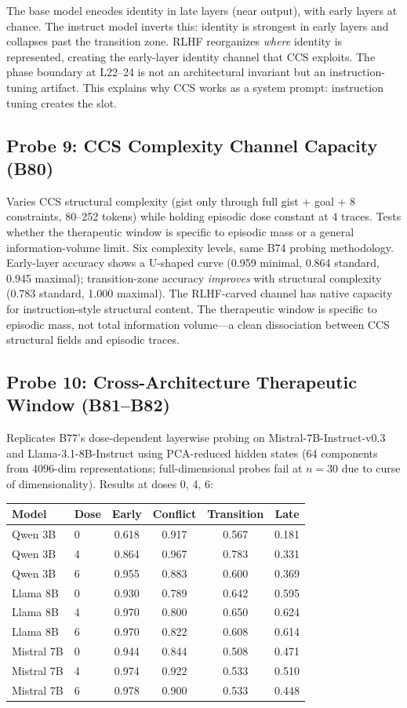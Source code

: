 \documentclass[11pt,a4paper]{article}
\begin{document}
The base model encodes identity in late layers (near output), with early
layers at chance. The instruct model inverts this: identity is strongest
in early layers and collapses past the transition zone. RLHF reorganizes
\emph{where} identity is represented, creating the early-layer identity
channel that CCS exploits. The phase boundary at L22--24 is not an
architectural invariant but an instruction-tuning artifact. This explains
why CCS works as a system prompt: instruction tuning creates the slot.

\subsection{Probe 9: CCS Complexity Channel Capacity (B80)}

Varies CCS structural complexity (gist only through full gist + goal + 8 constraints,
80--252 tokens) while holding episodic dose constant at 4 traces. Tests whether the
therapeutic window is specific to episodic mass or a general information-volume limit.
Six complexity levels, same B74 probing methodology. Early-layer accuracy shows a
U-shaped curve (0.959 minimal, 0.864 standard, 0.945 maximal); transition-zone
accuracy \emph{improves} with structural complexity (0.783 standard, 1.000 maximal).
The RLHF-carved channel has native capacity for instruction-style structural content.
The therapeutic window is specific to episodic mass, not total information volume---a
clean dissociation between CCS structural fields and episodic traces.

\subsection{Probe 10: Cross-Architecture Therapeutic Window (B81--B82)}

Replicates B77's dose-dependent layerwise probing on Mistral-7B-Instruct-v0.3
and Llama-3.1-8B-Instruct using PCA-reduced hidden states (64 components from
4096-dim representations; full-dimensional probes fail at $n=30$ due to
curse of dimensionality). Results at doses 0, 4, 6:

\begin{center}
\begin{tabular}{llcccc}
\toprule
Model & Dose & Early & Conflict & Transition & Late \\
\midrule
Qwen 3B  & 0 & 0.618 & 0.917 & 0.567 & 0.181 \\
Qwen 3B  & 4 & 0.864 & 0.967 & 0.783 & 0.331 \\
Qwen 3B  & 6 & 0.955 & 0.883 & 0.600 & 0.369 \\
\midrule
Llama 8B & 0 & 0.930 & 0.789 & 0.642 & 0.595 \\
Llama 8B & 4 & 0.970 & 0.800 & 0.650 & 0.624 \\
Llama 8B & 6 & 0.970 & 0.822 & 0.608 & 0.614 \\
\midrule
Mistral 7B & 0 & 0.944 & 0.844 & 0.508 & 0.471 \\
Mistral 7B & 4 & 0.974 & 0.922 & 0.533 & 0.510 \\
Mistral 7B & 6 & 0.978 & 0.900 & 0.533 & 0.448 \\
\bottomrule
\end{tabular}
\end{center}
\end{document}
